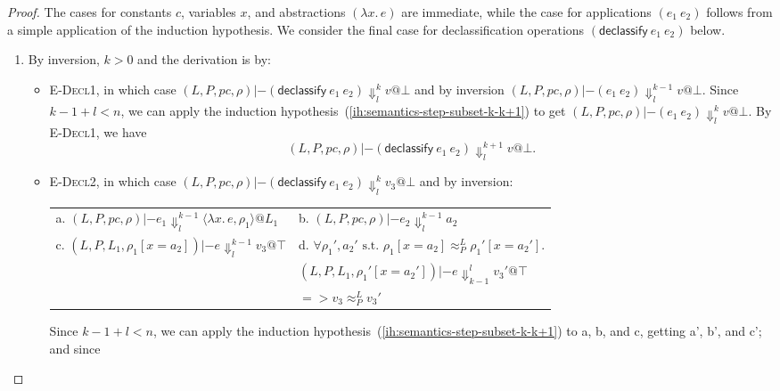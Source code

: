 \documentclass{article}
\makeatletter
\theoremstyle{definition}
\newcommand{\at}{\ensuremath{{\scriptstyle{@}}}}
\newcommand{\pc}{\ensuremath{{\mathit{pc}}}}
\makeatother
\begin{document}
\begin{proof}
  The cases for constants $c$, variables $x$, and abstractions
  $(\lambda{x}.\, e)$ are immediate, while the case for applications
  $(e_1\ e_2)$ follows from a simple application of the induction hypothesis.
  We consider the final case for declassification operations
  $(\mathsf{declassify}\ e_1\ e_2)$ below.
  \begin{enumerate}
  \item By inversion, $k > 0$ and the derivation is by:
    \begin{itemize}
    \item \textsc{E-Decl1}, in which case
      $(L, P, \pc, \rho) |- (\mathsf{declassify}\ e_1\ e_2)
      \Downarrow^{k}_{l} v \at \bot$ and by inversion
      $(L, P, \pc, \rho) |- (e_1\ e_2) \Downarrow^{k-1}_{l}
      v \at \bot$. Since $k-1 + l < n$, we can apply the induction
      hypothesis~(\ref{ih:semantics-step-subset-k-k+1}) to get
      $(L, P, \pc, \rho) |- (e_1\ e_2) \Downarrow^{k}_{l}
      v \at \bot$. By \textsc{E-Decl1}, we have
      \[(L, P, \pc, \rho) |- (\mathsf{declassify}\ e_1\ e_2)
      \Downarrow^{k+1}_{l} v \at \bot.\]
    \item \textsc{E-Decl2}, in which case
      $(L, P, \pc, \rho) |- (\mathsf{declassify}\ e_1\ e_2)
      \Downarrow^{k}_{l} v_3 \at \bot$ and by inversion:
      \begin{center}
        \begin{tabular*}{1.0\linewidth}{ll}
          a.
          $(L, P, \pc, \rho) |- e_1
          \Downarrow^{k-1}_{l}
          \langle{\lambda{x}.\, e, \rho_1\rangle} \at L_1$
          &
          b.
          $(L, P, \pc, \rho) |- e_2
          \Downarrow^{k-1}_{l}
          a_2$
          \\[1.8ex]
          c.
          $(L, P, L_1, \rho_1[x = a_2]) |- e
          \Downarrow^{k-1}_{l}
          v_3 \at \top$
          &
          d.
          $\forall{\rho_1', a_2' \text{ s.t. }
            \rho_1[x = a_2] \approx^{L}_{P} \rho_1'[x = a_2']}.$
          \\
          &
          \quad\quad
          $(L, P, L_1, \rho_1'[x = a_2']) |- e
          \Downarrow^{l}_{k-1} v_3' \at \top$
          \\
          &
          \quad\quad
          $=>
          v_3 \approx^{L}_{P} v_3'$
        \end{tabular*}
      \end{center}
      Since $k-1 + l < n$, we can apply the induction
      hypothesis~(\ref{ih:semantics-step-subset-k-k+1}) to a, b, and c,
      getting a', b', and c'; and since

\end{itemize}
\end{enumerate}
\end{proof}
\end{document}
